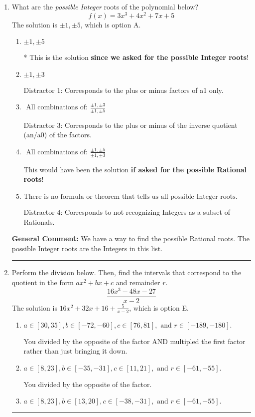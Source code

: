 \documentclass{extbook}[14pt]
\newcommand{\litem}[1]{\item #1

\rule{\textwidth}{0.4pt}}
\begin{document}
\begin{enumerate}\litem{
What are the \textit{possible Integer} roots of the polynomial below?
\[ f(x) = 3x^{3} +4 x^{2} +7 x + 5 \]The solution is \( \pm 1,\pm 5 \), which is option A.\begin{enumerate}[label=\Alph*.]
\item \( \pm 1,\pm 5 \)

* This is the solution \textbf{since we asked for the possible Integer roots}!
\item \( \pm 1,\pm 3 \)

 Distractor 1: Corresponds to the plus or minus factors of a1 only.
\item \( \text{ All combinations of: }\frac{\pm 1,\pm 3}{\pm 1,\pm 5} \)

 Distractor 3: Corresponds to the plus or minus of the inverse quotient (an/a0) of the factors. 
\item \( \text{ All combinations of: }\frac{\pm 1,\pm 5}{\pm 1,\pm 3} \)

This would have been the solution \textbf{if asked for the possible Rational roots}!
\item \( \text{There is no formula or theorem that tells us all possible Integer roots.} \)

 Distractor 4: Corresponds to not recognizing Integers as a subset of Rationals.
\end{enumerate}

\textbf{General Comment:} We have a way to find the possible Rational roots. The possible Integer roots are the Integers in this list.
}
\litem{
Perform the division below. Then, find the intervals that correspond to the quotient in the form $ax^2+bx+c$ and remainder $r$.
\[ \frac{16x^{3} -48 x -27}{x -2} \]The solution is \( 16x^{2} +32 x + 16 + \frac{5}{x -2} \), which is option E.\begin{enumerate}[label=\Alph*.]
\item \( a \in [30, 35], b \in [-72, -60], c \in [76, 81], \text{ and } r \in [-189, -180]. \)

 You divided by the opposite of the factor AND multipled the first factor rather than just bringing it down.
\item \( a \in [8, 23], b \in [-35, -31], c \in [11, 21], \text{ and } r \in [-61, -55]. \)

 You divided by the opposite of the factor.
\item \( a \in [8, 23], b \in [13, 20], c \in [-38, -31], \text{ and } r \in [-61, -55]. \)


\end{enumerate}}
\end{enumerate}
\end{document}
